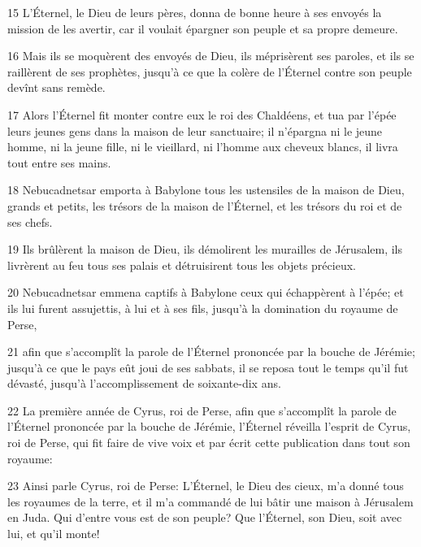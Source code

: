 \par 15 L'Éternel, le Dieu de leurs pères, donna de bonne heure à ses envoyés la mission de les avertir, car il voulait épargner son peuple et sa propre demeure.
\par 16 Mais ils se moquèrent des envoyés de Dieu, ils méprisèrent ses paroles, et ils se raillèrent de ses prophètes, jusqu'à ce que la colère de l'Éternel contre son peuple devînt sans remède.
\par 17 Alors l'Éternel fit monter contre eux le roi des Chaldéens, et tua par l'épée leurs jeunes gens dans la maison de leur sanctuaire; il n'épargna ni le jeune homme, ni la jeune fille, ni le vieillard, ni l'homme aux cheveux blancs, il livra tout entre ses mains.
\par 18 Nebucadnetsar emporta à Babylone tous les ustensiles de la maison de Dieu, grands et petits, les trésors de la maison de l'Éternel, et les trésors du roi et de ses chefs.
\par 19 Ils brûlèrent la maison de Dieu, ils démolirent les murailles de Jérusalem, ils livrèrent au feu tous ses palais et détruisirent tous les objets précieux.
\par 20 Nebucadnetsar emmena captifs à Babylone ceux qui échappèrent à l'épée; et ils lui furent assujettis, à lui et à ses fils, jusqu'à la domination du royaume de Perse,
\par 21 afin que s'accomplît la parole de l'Éternel prononcée par la bouche de Jérémie; jusqu'à ce que le pays eût joui de ses sabbats, il se reposa tout le temps qu'il fut dévasté, jusqu'à l'accomplissement de soixante-dix ans.
\par 22 La première année de Cyrus, roi de Perse, afin que s'accomplît la parole de l'Éternel prononcée par la bouche de Jérémie, l'Éternel réveilla l'esprit de Cyrus, roi de Perse, qui fit faire de vive voix et par écrit cette publication dans tout son royaume:
\par 23 Ainsi parle Cyrus, roi de Perse: L'Éternel, le Dieu des cieux, m'a donné tous les royaumes de la terre, et il m'a commandé de lui bâtir une maison à Jérusalem en Juda. Qui d'entre vous est de son peuple? Que l'Éternel, son Dieu, soit avec lui, et qu'il monte!



